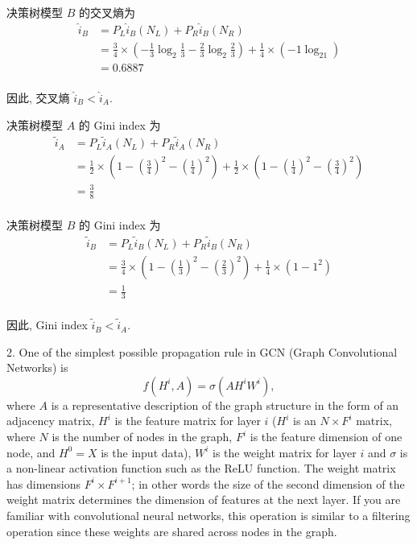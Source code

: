\documentclass[openany]{ctexbook}
\theoremstyle{kaiti}
\theoremstyle{normal}
\begin{document}
决策树模型 $B$ 的交叉熵为
\begin{equation}
  \begin{aligned}
    \hat{i}_B
    &=P_L\hat{i}_B(N_L)+P_R\hat{i}_B(N_R)\\
    &=\frac{3}{4}\times\left(-\frac{1}{3}\log_2\frac{1}{3}-\frac{2}{3}\log_2\frac{2}{3}\right)+\frac{1}{4}\times\left(-1\log_21\right)\\
    &=0.6887\\
  \end{aligned}
\end{equation}

因此, 交叉熵 $\hat{i}_B < \hat{i}_A$.

决策树模型 $A$ 的 Gini index 为
\begin{equation}
  \begin{aligned}
    \tilde{i}_A
    &=P_L\tilde{i}_A(N_L)+P_R\tilde{i}_A(N_R)\\
    &=\frac{1}{2}\times\left(1-\left(\frac{3}{4}\right)^2-\left(\frac{1}{4}\right)^2\right)+\frac{1}{2}\times\left(1-\left(\frac{1}{4}\right)^2-\left(\frac{3}{4}\right)^2\right)\\
    &=\frac{3}{8}\\
  \end{aligned}
\end{equation}
 
决策树模型 $B$ 的 Gini index 为
\begin{equation}
  \begin{aligned}
    \tilde{i}_B
    &=P_L\tilde{i}_B(N_L)+P_R\tilde{i}_B(N_R)\\
    &=\frac{3}{4}\times\left(1-\left(\frac{1}{3}\right)^2-\left(\frac{2}{3}\right)^2\right)+\frac{1}{4}\times(1-1^2)\\
    &=\frac{1}{3}\\
  \end{aligned}
\end{equation}

因此, Gini index $\tilde{i}_B < \tilde{i}_A$.

2. One of the simplest possible propagation rule in GCN (Graph Convolutional Networks) is
\begin{equation}
  f(H^i, A) = \sigma(A H^i W^i),
\end{equation}
where $A$ is  a representative description of the graph structure in the form of an adjacency matrix, $H^i$ is the feature matrix for layer $i$ ($H^i$ is an $N \times F^{i}$ matrix, where $N$ is the number of nodes in the graph, $F^i$ is the feature dimension of one node, and $H^0 = X$ is the input data), $W^i$ is the weight matrix for layer $i$ and $\sigma$ is a non-linear activation function such as the ReLU function. The weight matrix has dimensions $F^i \times F^{i+1}$; in other words the size of the second dimension of the weight matrix determines the dimension of features at the next layer. If you are familiar with convolutional neural networks, this operation is similar to a filtering operation since these weights are shared across nodes in the graph.
\end{document}
